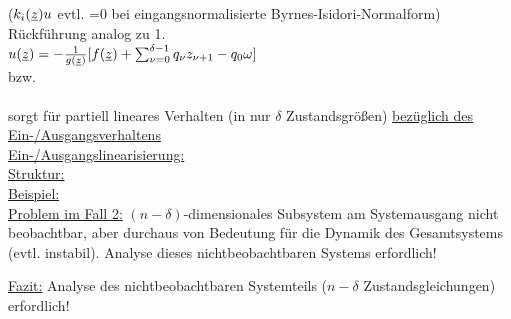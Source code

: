 \documentclass[openany,a4paper,11pt]{book}
\begin{document}
\begin{enumerate}
\begin{minipage}[c]{\textwidth}
    \end{minipage}
    ($k_i(\uline{z})u$ evtl. =0 bei eingangsnormalisierte Byrnes-Isidori-Normalform)\\
    Rückführung analog zu 1.\\
    $u(\uline{z})=-\frac{1}{g(\uline{z})}[f(\uline{z})+\sum
    _{\nu=0}^{\delta-1}q_{\nu}z_{\nu+1}-q_0\omega]$\\ bzw.\\
    \\
    sorgt für partiell lineares Verhalten (in nur $\delta$ Zustandsgrößen) \uline{bezüglich des Ein-/Ausgangsverhaltens}\\
    \uline{Ein-/Ausgangslinearisierung:} \\
    \uline{Struktur:}  \\
    \uline{Beispiel:} \\
    \uline{Problem im Fall 2:} $(n-\delta)$-dimensionales Subsystem am Systemausgang nicht beobachtbar, aber durchaus von Bedeutung für die Dynamik des Gesamtsystems (evtl. instabil). Analyse dieses nichtbeobachtbaren Systems erfordlich!
\end{enumerate}
\uline{Fazit:} Analyse des nichtbeobachtbaren Systemteils ($n-\delta$ Zustandsgleichungen) erfordlich!
\end{document}
